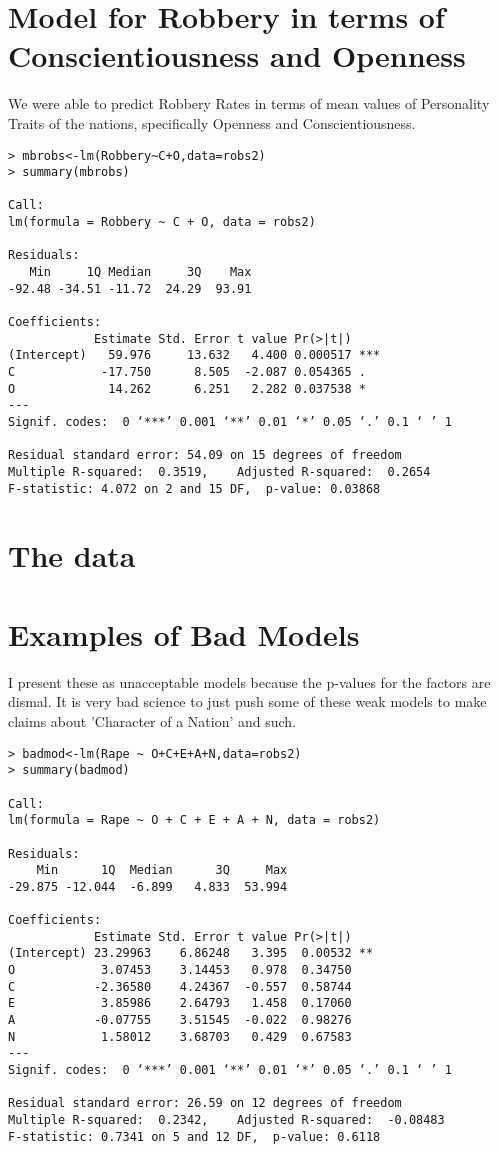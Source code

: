 \documentclass{amsart}
\begin{document}
\section{Model for Robbery in terms of Conscientiousness and Openness}

We were able to predict Robbery Rates in terms of mean values of Personality Traits of the nations, specifically Openness and Conscientiousness. 

\begin{verbatim}
> mbrobs<-lm(Robbery~C+O,data=robs2)
> summary(mbrobs)

Call:
lm(formula = Robbery ~ C + O, data = robs2)

Residuals:
   Min     1Q Median     3Q    Max 
-92.48 -34.51 -11.72  24.29  93.91 

Coefficients:
            Estimate Std. Error t value Pr(>|t|)    
(Intercept)   59.976     13.632   4.400 0.000517 ***
C            -17.750      8.505  -2.087 0.054365 .  
O             14.262      6.251   2.282 0.037538 *  
---
Signif. codes:  0 ‘***’ 0.001 ‘**’ 0.01 ‘*’ 0.05 ‘.’ 0.1 ‘ ’ 1

Residual standard error: 54.09 on 15 degrees of freedom
Multiple R-squared:  0.3519,	Adjusted R-squared:  0.2654 
F-statistic: 4.072 on 2 and 15 DF,  p-value: 0.03868
\end{verbatim}

\section{The data}

\section{Examples of Bad Models}
I present these as unacceptable models because the p-values for the factors are dismal.  It is very bad science to just push some of these weak models to make claims about 'Character of a Nation' and such.
\begin{verbatim}
> badmod<-lm(Rape ~ O+C+E+A+N,data=robs2)
> summary(badmod)

Call:
lm(formula = Rape ~ O + C + E + A + N, data = robs2)

Residuals:
    Min      1Q  Median      3Q     Max 
-29.875 -12.044  -6.899   4.833  53.994 

Coefficients:
            Estimate Std. Error t value Pr(>|t|)   
(Intercept) 23.29963    6.86248   3.395  0.00532 **
O            3.07453    3.14453   0.978  0.34750   
C           -2.36580    4.24367  -0.557  0.58744   
E            3.85986    2.64793   1.458  0.17060   
A           -0.07755    3.51545  -0.022  0.98276   
N            1.58012    3.68703   0.429  0.67583   
---
Signif. codes:  0 ‘***’ 0.001 ‘**’ 0.01 ‘*’ 0.05 ‘.’ 0.1 ‘ ’ 1

Residual standard error: 26.59 on 12 degrees of freedom
Multiple R-squared:  0.2342,	Adjusted R-squared:  -0.08483 
F-statistic: 0.7341 on 5 and 12 DF,  p-value: 0.6118
\end{verbatim}
\end{document}
